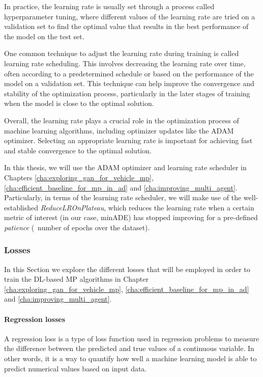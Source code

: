 In practice, the learning rate is usually set through a process called hyperparameter tuning, where different values of the learning rate are tried on a validation set to find the optimal value that results in the best performance of the model on the test set.

One common technique to adjust the learning rate during training is called learning rate scheduling. This involves decreasing the learning rate over time, often according to a predetermined schedule or based on the performance of the model on a validation set. This technique can help improve the convergence and stability of the optimization process, particularly in the later stages of training when the model is close to the optimal solution.

Overall, the learning rate plays a crucial role in the optimization process of machine learning algorithms, including optimizer updates like the \ac{ADAM} optimizer. Selecting an appropriate learning rate is important for achieving fast and stable convergence to the optimal solution.

In this thesis, we will use the \ac{ADAM} optimizer and learning rate scheduler in Chapters \ref{cha:exploring_gan_for_vehicle_mp}, \ref{cha:efficient_baseline_for_mp_in_ad} and \ref{cha:improving_multi_agent}. Particularly, in terms of the learning rate scheduler, we will make use of the well-established \textit{ReduceLROnPlateau}, which reduces the learning rate when a certain metric of interest (in our case, \ac{minADE}) has stopped improving for a pre-defined \textit{patience} (\ie \ number of epochs over the dataset).

\subsubsection{Losses}
\label{subsubsec:3_losses}

In this Section we explore the different losses that will be employed in order to train the \ac{DL}-based \ac{MP} algorithms in Chapter \ref{cha:exploring_gan_for_vehicle_mp}, \ref{cha:efficient_baseline_for_mp_in_ad} and \ref{cha:improving_multi_agent}.

\paragraph{Regression losses}
\label{par:3_regressions_losses}


A regression loss is a type of loss function used in regression problems to measure the difference between the predicted and true values of a continuous variable. In other words, it is a way to quantify how well a machine learning model is able to predict numerical values based on input data.

